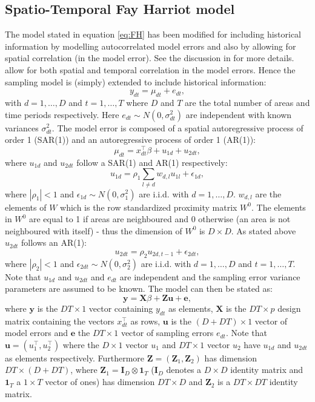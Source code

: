 \subsection{Spatio-Temporal Fay Harriot
model}\label{spatio-temporal-fay-harriot-model}

The model stated in equation \ref{eq:FH} has been modified for including
historical information by modelling autocorrelated model errors and also
by allowing for spatial correlation (in the model error). See the
discussion in \textcite{Mar13} for more details. \textcite{Mar13} allow
for both spatial and temporal correlation in the model errors. Hence the
sampling model is (simply) extended to include historical information:
\[
y_{dt} = \mu_{dt} + e_{dt},
\] with $d = 1, \dots, D$ and $t = 1, \dots, T$ where $D$ and $T$ are
the total number of areas and time periods respectively. Here
$e_{dt} \sim \mathit{N}(0, \sigma^2_{dt})$ are independent with known
variances $\sigma_{dt}^2$. The model error is composed of a spatial
autoregressive process of order 1 (SAR(1)) and an autoregressive process
of order 1 (AR(1)): \[
\mu_{dt} = x^\top_{dt}\beta + u_{1d} + u_{2dt},
\] where $u_{1d}$ and $u_{2dt}$ follow a SAR(1) and AR(1) respectively:
\[
u_{1d} = \rho_1 \sum_{l\neq d}w_{d,l} u_{1l} + \epsilon_{1d},
\] where $|\rho_1| < 1$ and
$\epsilon_{1d} \sim \mathit{N}(0, \sigma_1^2)$ are i.i.d. with
$d = 1,\dots, D$. $w_{d, l}$ are the elements of $W$ which is the row
standardized proximity matrix $W^0$. The elements in $W^0$ are equal to
1 if areas are neighboured and 0 otherwise (an area is not neighboured
with itself) - thus the dimension of $W^0$ is $D\times D$. As stated
above $u_{2dt}$ follows an AR(1): \[
u_{2dt} = \rho_2 u_{2d, t-1} + \epsilon_{2dt},
\] where $|\rho_2| < 1$ and
$\epsilon_{2dt} \sim \mathit{N}(0, \sigma_2^2)$ are i.i.d. with
$d = 1, \dots, D$ and $t = 1, \dots, T$. Note that $u_{1d}$ and
$u_{2dt}$ and $e_{dt}$ are independent and the sampling error variance
parameters are assumed to be known. The model can then be stated as: \[
\mathbf{y} = \mathbf{X}\beta + \mathbf{Z}\mathbf{u} + \mathbf{e},
\] where $\mathbf{y}$ is the $DT\times 1$ vector containing $y_{dt}$ as
elements, $\mathbf{X}$ is the $DT \times p$ design matrix containing the
vectors $x^\top_{dt}$ as rows, $\mathbf{u}$ is the $(D + DT) \times 1$
vector of model errors and $\mathbf{e}$ the $DT \times 1$ vector of
sampling errors $e_{dt}$. Note that $\mathbf{u} = (u_1^\top, u_2^\top)$
where the $D\times 1$ vector $u_1$ and $DT \times 1$ vector $u_2$ have
$u_{1d}$ and $u_{2dt}$ as elements respectively. Furthermore
$\mathbf{Z} = (\mathbf{Z}_1, \mathbf{Z}_2)$ has dimension
$DT \times (D+DT)$, where
$\mathbf{Z}_1 = \mathbf{I}_D \otimes \mathbf{1}_T$ ($\mathbf{I}_D$
denotes a $D\times D$ identity matrix and $\mathbf{1}_T$ a $1 \times T$
vector of ones) has dimension $DT \times D$ and $\mathbf{Z}_2$ is a
$DT \times DT$ identity matrix.

